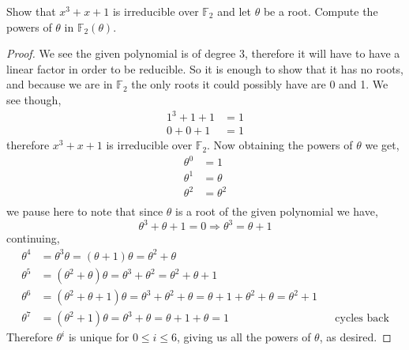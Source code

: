 \documentclass[11pt]{article}
\newenvironment{problem}[2][Problem\!]{\begin{tcolorbox}\begin{trivlist}
\item[\hskip \labelsep {\bfseries #1}\hskip \labelsep {\bfseries #2}]}{\end{trivlist}\end{tcolorbox}}
\newcommand{\ff}{\mathbb F}   %
\renewcommand{\leq}{\leqslant}
\begin{document}
\begin{problem}{13.1.3}
    Show that $x^{3} + x + 1$ is irreducible over $\ff_2$ and let $\theta$ be a root. Compute the powers of $\theta$ in $\ff_2(\theta)$.
\end{problem}
\begin{proof}
    We see the given polynomial is of degree 3, therefore it will have to have a linear factor in order to be reducible. So it is enough to show that it has no roots, and because we are in $\ff_2$ the only roots it could possibly have are 0 and 1. We see though,
    \begin{align*}
        1^{3} + 1 + 1 &= 1 \\
        0 + 0 + 1 & = 1 
    \end{align*}
    therefore $x^{3} + x + 1$ is irreducible over $\ff_2$. Now obtaining the powers of $\theta$ we get,
    \begin{align*}
        \theta^{0} &= 1 \\
        \theta^{1} &= \theta \\
        \theta^{2} &= \theta^{2} \\ 
    \end{align*}
    we pause here to note that since $\theta$ is a root of the given polynomial we have,
    \[\theta^{3} + \theta + 1 = 0 \Rightarrow \theta^{3} = \theta + 1\]
    continuing,
    \begin{align*}
        \theta^{4} &= \theta^{3}\theta = (\theta + 1)\theta = \theta^{2} + \theta \\
        \theta^{5} &= (\theta^{2} + \theta)\theta = \theta^{3} +\theta^{2} = \theta^{2} + \theta + 1\\
        \theta^{6} &= (\theta^{2} + \theta + 1)\theta = \theta^{3} + \theta^{2} + \theta = \theta + 1 +\theta^{2} + \theta = \theta^{2} + 1 \\
        \theta^{7} &= (\theta^{2} + 1)\theta = \theta^{3} + \theta = \theta + 1 +\theta = 1 && \text{cycles back}
    \end{align*} 
    Therefore $\theta^{i}$ is unique for $0 \leq i \leq 6$, giving us all the powers of $\theta$, as desired.
 \end{proof}
\end{document}
